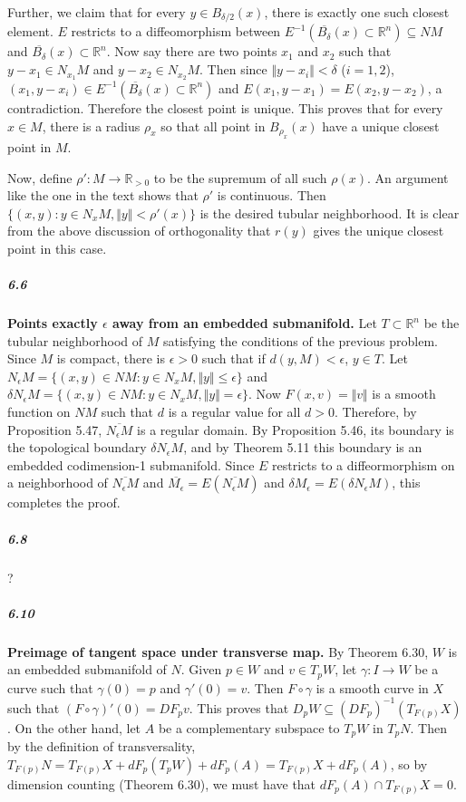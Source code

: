 \documentclass[10pt,letter]{article}
\begin{document}
Further, we claim that for every $y \in B_{\delta/2}(x)$, there is exactly one such closest element. $E$ restricts to a diffeomorphism between $E^{-1}(\overline{B_{\delta}}(x) \subset \mathbb{R}^n) \subseteq NM$ and $\overline{B_{\delta}}(x) \subset \mathbb{R}^n$. Now say there are two points $x_1$ and $x_2$ such that $y-x_1 \in N_{x_1}M$ and $y-x_2 \in N_{x_2}M$. Then since $\Vert y-x_i \Vert < \delta$ ($i = 1,2$), $(x_1,y-x_i) \in E^{-1}(\overline{B_{\delta}}(x) \subset \mathbb{R}^n)$ and $E(x_1,y-x_1) = E(x_2,y-x_2)$, a contradiction. Therefore the closest point is unique. This proves that for every $x \in M$, there is a radius $\rho_x$ so that all point in $B_{\rho_x}(x)$ have a unique closest point in $M$. 

Now, define $\rho': M \rightarrow \mathbb{R}_{> 0}$ to be the supremum of all such $\rho(x)$. An argument like the one in the text shows that $\rho'$ is continuous. Then $\lbrace (x,y): y \in N_xM, \Vert y \Vert < \rho'(x) \rbrace$ is the desired tubular neighborhood. It is clear from the above discussion of orthogonality that $r(y)$ gives the unique closest point in this case. 

\subparagraph{6.6} {\bf Points exactly $\epsilon$ away from an embedded submanifold.} Let $T \subset \mathbb{R}^n$ be the tubular neighborhood of $M$ satisfying the conditions of the previous problem. Since $M$ is compact, there is $\epsilon > 0$ such that if $d(y,M) < \epsilon$, $y \in T$. Let $N_{\epsilon}M = \lbrace (x,y) \in NM: y \in N_xM, \Vert y \Vert \leq \epsilon \rbrace$ and $\delta N_{\epsilon}M = \lbrace (x,y) \in NM: y \in N_xM, \Vert y \Vert = \epsilon \rbrace$. Now $F(x,v) = \Vert v \Vert$ is a smooth function on $NM$ such that $d$ is a regular value for all $d > 0$. Therefore, by Proposition 5.47, $\overline{N_{\epsilon}M}$ is a regular domain. By Proposition 5.46, its boundary is the topological boundary $\delta N_{\epsilon}M$, and by Theorem 5.11 this boundary is an embedded codimension-1 submanifold. Since $E$ restricts to a diffeormorphism on a neighborhood of $\overline{N_{\epsilon}M}$ and $\overline{M_{\epsilon}} = E(\overline{N_{\epsilon}M})$ and $\delta M_{\epsilon} = E(\delta N_{\epsilon}M)$, this completes the proof. 

\subparagraph{6.8} ? 

\subparagraph{6.10} {\bf Preimage of tangent space under transverse map.} By Theorem 6.30, $W$ is an embedded submanifold of $N$. Given $p \in W$ and $v \in T_pW$, let $\gamma: I \rightarrow W$ be a curve such that $\gamma(0) = p$ and $\gamma'(0) = v$. Then $F \circ \gamma$ is a smooth curve in $X$ such that $(F \circ \gamma)'(0) = DF_p v$. This proves that $D_p W \subseteq (DF_p)^{-1}(T_{F(p)}X)$. On the other hand, let $A$ be a complementary subspace to $T_pW$ in $T_pN$. Then by the definition of transversality, $T_{F(p)}N = T_{F(p)}X + dF_p(T_pW) + dF_p(A) = T_{F(p)}X + dF_p(A)$, so by dimension counting (Theorem 6.30), we must have that $dF_p(A) \cap   T_{F(p)}X  = 0$.
\end{document}
